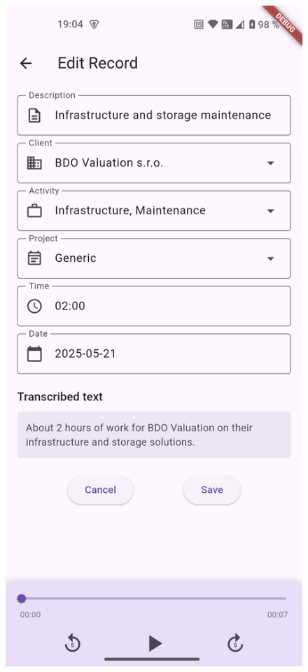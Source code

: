 \documentclass[
  digital,     %
  oneside,     %
  nosansbold,  %
  nocolorbold, %
  lof,         %
  lot,         %
]{fithesis4}
\begin{document}
\vspace{1em}

\begin{center}
\begin{minipage}{0.45\textwidth}
  \begin{figure}[H]
    \centering
    \includegraphics[width=\textwidth]{assets/edit_record.png}

\end{figure}
\end{minipage}
\end{center}
\end{document}
